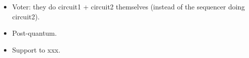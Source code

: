 
\begin{itemize}
	\item Voter: they do circuit1 + circuit2 themselves (instead of the sequencer doing circuit2).
	\item Post-quantum.
	\item Support to xxx.
\end{itemize}